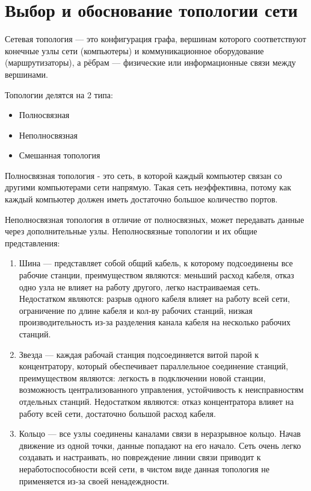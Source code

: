 \documentclass[russian,utf8,pointsection,simple,14pt]{eskdtext}
\begin{document}
	\maketitle
	\newpage
	\tableofcontents
	\newpage
	\section{Выбор и обоснование топологии сети}
	Сетевая топология — это конфигурация графа, вершинам которого соответствуют конечные узлы сети (компьютеры) и коммуникационное оборудование (маршрутизаторы), а рёбрам — физические или информационные связи между вершинами. 
	
	\point Топологии делятся на 2 типа:
	\begin{itemize}
		\item  Полносвязная
		\item Неполносвязная
		\item Смешанная топология
		
	\end{itemize}

Полносвязная топология - это сеть, в которой каждый компьютер связан со другими компьютерами сети напрямую. Такая сеть неэффективна, потому как каждый компьютер должен иметь достаточно большое количество портов.

Неполносвязная топология в отличие от полносвязных, может передавать данные через дополнительные узлы.
\point Неполносвязные топологии и их общие представления:
\begin{enumerate}
\item Шина --- представляет собой общий кабель, к которому подсоединены все рабочие станции, преимуществом являются: меньший расход кабеля, отказ одно узла не влияет на работу другого, легко настраиваемая сеть. Недостатком являются: разрыв одного кабеля влияет на работу всей сети, ограничение по длине кабеля и кол-ву рабочих станций, низкая производительность из-за разделения канала кабеля на несколько рабочих станций.
\item Звезда --- каждая рабочай станция подсоединяется витой парой к концентратору, который обеспечивает параллельное соединение станций, преимуществом являются: легкость в подключении новой станции, возможность централизованного управления, устойчивость к неисправностям отдельных станций. Недостатком являются: отказ концентратора влияет на работу всей сети, достаточно большой расход кабеля.
\item Кольцо --- все узлы соединены каналами связи в неразрывное кольцо. Начав движение из одной точки, данные попадают на его начало. Сеть очень легко создавать и настраивать, но повреждение линии связи приводит к неработоспособности всей сети, в чистом виде данная топология не применяется из-за своей ненадеждности.
\end{enumerate}
\end{document}
